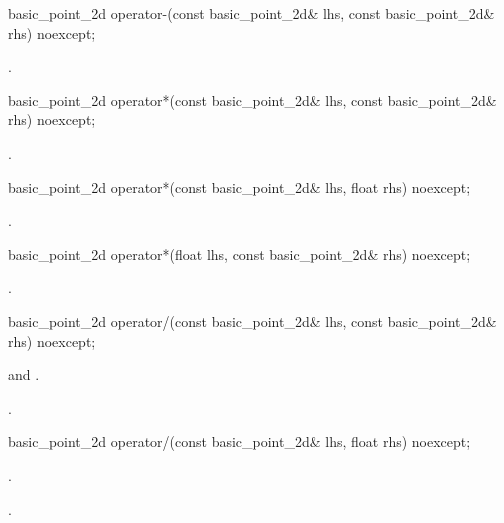 %
\begin{itemdecl}
basic_point_2d operator-(const basic_point_2d& lhs, const basic_point_2d& rhs) noexcept;
\end{itemdecl}
\begin{itemdescr}
\pnum
\returns
{}.
\end{itemdescr}

%
\begin{itemdecl}
basic_point_2d operator*(const basic_point_2d& lhs, const basic_point_2d& rhs) noexcept;
\end{itemdecl}
\begin{itemdescr}
\pnum
\returns
{}.
\end{itemdescr}

%
\begin{itemdecl}
basic_point_2d operator*(const basic_point_2d& lhs, float rhs) noexcept;
\end{itemdecl}
\begin{itemdescr}
\pnum
\returns
{}.
\end{itemdescr}

%
\begin{itemdecl}
basic_point_2d operator*(float lhs, const basic_point_2d& rhs) noexcept;
\end{itemdecl}
\begin{itemdescr}
\pnum
\returns
{}.
\end{itemdescr}

%
\begin{itemdecl}
basic_point_2d operator/(const basic_point_2d& lhs, const basic_point_2d& rhs) noexcept;
\end{itemdecl}
\begin{itemdescr}
\pnum
\requires {} and .

\pnum
\returns
{}.
\end{itemdescr}

%
\begin{itemdecl}
basic_point_2d operator/(const basic_point_2d& lhs, float rhs) noexcept;
\end{itemdecl}
\begin{itemdescr}
\pnum
\requires
{}.

\pnum
\returns
{}.
\end{itemdescr}

